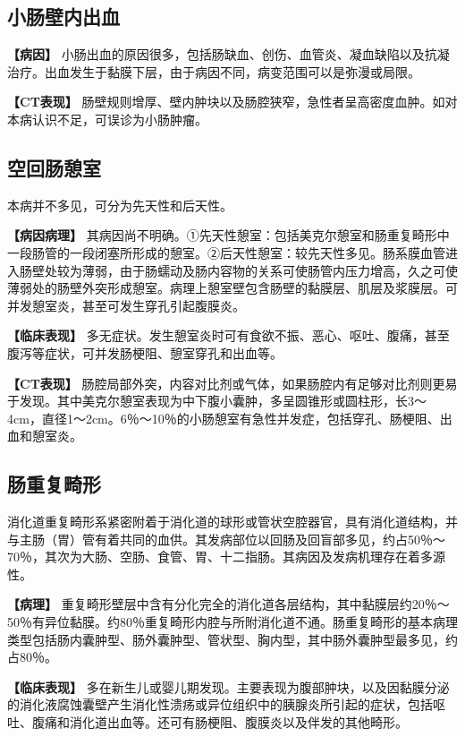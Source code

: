 \subsection{小肠壁内出血}

\textbf{【病因】}
小肠出血的原因很多，包括肠缺血、创伤、血管炎、凝血缺陷以及抗凝治疗。出血发生于黏膜下层，由于病因不同，病变范围可以是弥漫或局限。

\textbf{【CT表现】}
肠壁规则增厚、壁内肿块以及肠腔狭窄，急性者呈高密度血肿。如对本病认识不足，可误诊为小肠肿瘤。

\subsection{空回肠憩室}

本病并不多见，可分为先天性和后天性。

\textbf{【病因病理】}
其病因尚不明确。①先天性憩室：包括美克尔憩室和肠重复畸形中一段肠管的一段闭塞所形成的憩室。②后天性憩室：较先天性多见。肠系膜血管进入肠壁处较为薄弱，由于肠蠕动及肠内容物的关系可使肠管内压力增高，久之可使薄弱处的肠壁外突形成憩室。病理上憩室壁包含肠壁的黏膜层、肌层及浆膜层。可并发憩室炎，甚至可发生穿孔引起腹膜炎。

\textbf{【临床表现】}
多无症状。发生憩室炎时可有食欲不振、恶心、呕吐、腹痛，甚至腹泻等症状，可并发肠梗阻、憩室穿孔和出血等。

\textbf{【CT表现】}
肠腔局部外突，内容对比剂或气体，如果肠腔内有足够对比剂则更易于发现。其中美克尔憩室表现为中下腹小囊肿，多呈圆锥形或圆柱形，长3～4cm，直径1～2cm。6％～10％的小肠憩室有急性并发症，包括穿孔、肠梗阻、出血和憩室炎。

\subsection{肠重复畸形}

消化道重复畸形系紧密附着于消化道的球形或管状空腔器官，具有消化道结构，并与主肠（胃）管有着共同的血供。其发病部位以回肠及回盲部多见，约占50％～70％，其次为大肠、空肠、食管、胃、十二指肠。其病因及发病机理存在着多源性。

\textbf{【病理】}
重复畸形壁层中含有分化完全的消化道各层结构，其中黏膜层约20％～50％有异位黏膜。约80％重复畸形内腔与所附消化道不通。肠重复畸形的基本病理类型包括肠内囊肿型、肠外囊肿型、管状型、胸内型，其中肠外囊肿型最多见，约占80％。

\textbf{【临床表现】}
多在新生儿或婴儿期发现。主要表现为腹部肿块，以及因黏膜分泌的消化液腐蚀囊壁产生消化性溃疡或异位组织中的胰腺炎所引起的症状，包括呕吐、腹痛和消化道出血等。还可有肠梗阻、腹膜炎以及伴发的其他畸形。

